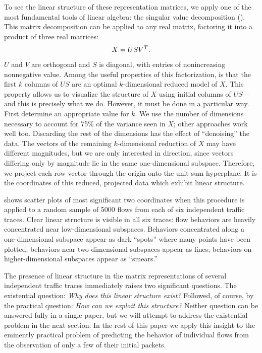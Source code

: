 \documentclass[conference]{IEEEtran}
\begin{document}
To see the linear structure of these representation matrices, we apply one of the most fundamental tools of linear algebra:
the singular value decomposition ().
This matrix decomposition can be applied to any real matrix, factoring it into a product of three real matrices:
\begin{align}
  X = US{V}^T.
\end{align}
$U$ and $V$ are orthogonal and $S$ is diagonal, with entries of nonincreasing nonnegative value.
Among the useful properties of this factorization, is that the first $k$ columns of $US$ are an optimal $k$-dimensional reduced model of $X$.\svdnote
This property allows us to visualize the structure of $X$ using initial columns of $US$---and this is precisely what we do.
However, it must be done in a particular way.
First determine an appropriate value for $k$.
We use the number of dimensions necessary to account for 75\% of the variance seen in $X$;
other approaches work well too.
Discarding the rest of the dimensions has the effect of ``denoising'' the data.
The vectors of the remaining $k$-dimensional reduction of $X$ may have different magnitudes, but we are only interested in direction, since vectors differing only by magnitude lie in the same one-dimensional subspace.
Therefore, we project each row vector through the origin onto the unit-sum hyperplane.\projectionnote
It is the coordinates of this reduced, projected data which exhibit linear structure.

 shows scatter plots of most significant two coordinates when this procedure is applied to a random sample of 5000 flows from each of six independent traffic traces.
Clear linear structure is visible in all six traces:
flow behaviors are heavily concentrated near low-dimensional subspaces.
Behaviors concentrated along a one-dimensional subspace appear as dark ``spots'' where many points have been plotted;
behaviors near two-dimensional subspaces appear as lines;
behaviors on higher-dimensional subspaces appear as ``smears.''

The presence of linear structure in the matrix representations of several independent traffic traces immediately raises two significant questions.
The existential question: \emph{Why does this linear structure exist?}
Followed, of course, by the practical question: \emph{How can we exploit this structure?}
Neither question can be answered fully in a single paper, but we will attempt to address the existential problem in the next section.
In the rest of this paper we apply this insight to the eminently practical problem of predicting the behavior of individual flows from the observation of only a few of their initial packets.
\end{document}
